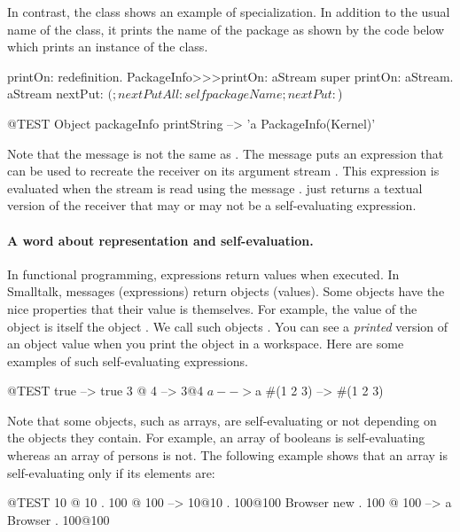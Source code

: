 \documentclass[a4paper,10pt,twoside]{book}
\begin{document}
In contrast, the class  shows an example of  specialization.
In addition to the usual name of the class, it prints the name of the package as shown by the code below which prints an instance of the class.

\begin{method}[zork]{printOn: redefinition.}
PackageInfo>>>printOn: aStream
	super printOn: aStream.
	aStream
		nextPut: $(;
		nextPutAll: self packageName;
		nextPut: $)
\end{method}

\begin{code}{@TEST}
Object packageInfo printString --> 'a PackageInfo(Kernel)'
\end{code}

Note that the message  is not the same as .
The message  puts an expression that can be used to recreate the receiver on its argument stream .
This expression is evaluated when the stream is read using the message .
 just returns a textual version of the receiver that may or may not be a self-evaluating expression.

\paragraph{A word about representation and self-evaluation.}
In functional programming, expressions return values when executed.
In Smalltalk, messages (expressions) return objects (values).
Some objects have the nice properties that their value is themselves.
For example, the value of the object  is itself \ie the object .
We call such objects .
You can see a \emph{printed} version of an object value when you print the object in a workspace.
Here are some examples of such self-evaluating expressions.

\begin{code}{@TEST}
true       --> true
3 @ 4     --> 3@4
$a         --> $a
#(1 2 3) --> #(1 2 3)
\end{code}

Note that some objects, such as arrays, are self-evaluating or not depending on the objects they contain.
For example, an array of booleans is self-evaluating whereas an array of persons is not.
The following example shows that an array is self-evaluating only if its elements are:
\begin{code}{@TEST}
{10 @ 10 . 100 @ 100}          --> {10@10 . 100@100}
{Browser new . 100 @ 100} --> {a Browser . 100@100}
\end{code}
\end{document}
